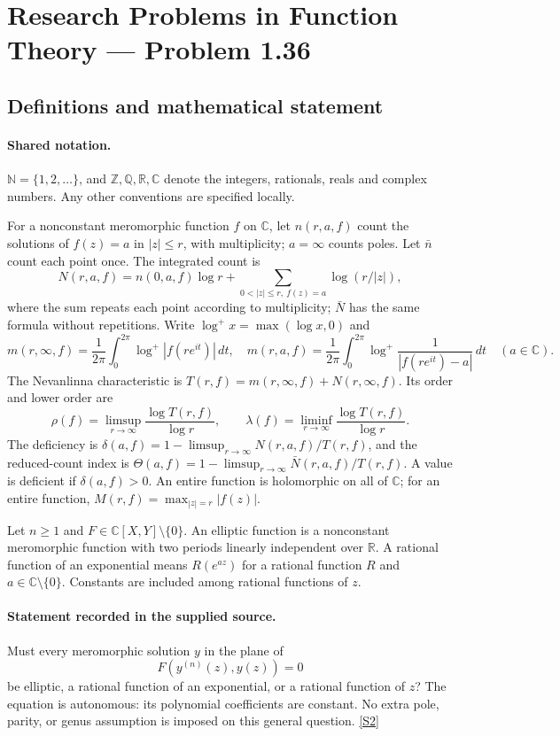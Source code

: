 \documentclass[11pt]{article}
\newcommand{\sref}[2]{\hyperlink{source:#1:#2}{[S#2]}}
\begin{document}
\section{Research Problems in Function Theory — Problem 1.36}\label{statement}

\subsection{Definitions and mathematical statement}

\paragraph{Shared notation.}$\mathbb N=\{1,2,\ldots\}$, and $\mathbb Z,\mathbb Q,\mathbb R,\mathbb C$ denote the integers, rationals, reals and complex numbers. Any other conventions are specified locally.


For a nonconstant meromorphic function $f$ on $\mathbb C$, let $n(r,a,f)$ count the solutions of $f(z)=a$ in $|z|\le r$, with multiplicity; $a=\infty$ counts poles. Let $\bar n$ count each point once. The integrated count is
\[
 N(r,a,f)=n(0,a,f)\log r+\sum_{0<|z|\le r,\ f(z)=a}\log(r/|z|),
\]
where the sum repeats each point according to multiplicity; $\bar N$ has the same formula without repetitions. Write $\log^+x=\max(\log x,0)$ and
\[
 m(r,\infty,f)=\frac1{2\pi}\int_0^{2\pi}\log^+|f(re^{it})|\,dt,\quad
 m(r,a,f)=\frac1{2\pi}\int_0^{2\pi}\log^+\frac1{|f(re^{it})-a|}\,dt\quad(a\in\mathbb C).
\]
The Nevanlinna characteristic is $T(r,f)=m(r,\infty,f)+N(r,\infty,f)$. Its order and lower order are
\[
 \rho(f)=\limsup_{r\to\infty}\frac{\log T(r,f)}{\log r},\qquad
 \lambda(f)=\liminf_{r\to\infty}\frac{\log T(r,f)}{\log r}.
\]
The deficiency is $\delta(a,f)=1-\limsup_{r\to\infty}N(r,a,f)/T(r,f)$, and the reduced-count index is $\Theta(a,f)=1-\limsup_{r\to\infty}\bar N(r,a,f)/T(r,f)$. A value is deficient if $\delta(a,f)>0$. An entire function is holomorphic on all of $\mathbb C$; for an entire function, $M(r,f)=\max_{|z|=r}|f(z)|$.

Let $n\ge1$ and $F\in\mathbb C[X,Y]\setminus\{0\}$. An elliptic function is a nonconstant meromorphic function with two periods linearly independent over $\mathbb R$. A rational function of an exponential means $R(e^{az})$ for a rational function $R$ and $a\in\mathbb C\setminus\{0\}$. Constants are included among rational functions of $z$.
\paragraph{Statement recorded in the supplied source.}
Must every meromorphic solution $y$ in the plane of
\[
 F(y^{(n)}(z),y(z))=0
\]
be elliptic, a rational function of an exponential, or a rational function of $z$? The equation is autonomous: its polynomial coefficients are constant. No extra pole, parity, or genus assumption is imposed on this general question. \sref{statement}{2}
\end{document}
